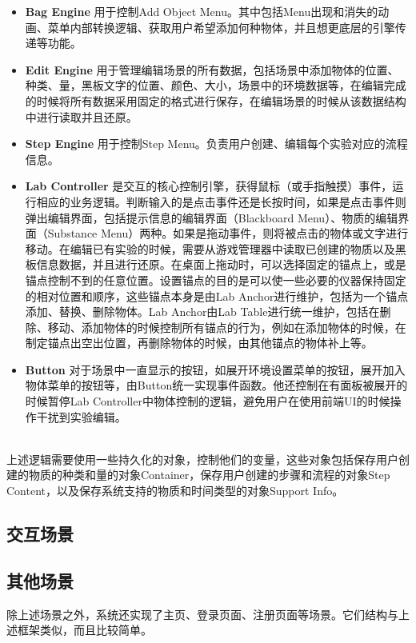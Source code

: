 \begin{itemize}
    \item \textbf{Bag Engine}
用于控制Add Object Menu。其中包括Menu出现和消失的动画、菜单内部转换逻辑、获取用户希望添加何种物体，并且想更底层的引擎传递等功能。
    
    \item \textbf{Edit Engine}
用于管理编辑场景的所有数据，包括场景中添加物体的位置、种类、量，黑板文字的位置、颜色、大小，场景中的环境数据等，在编辑完成的时候将所有数据采用固定的格式进行保存，在编辑场景的时候从该数据结构中进行读取并且还原。
    
    \item \textbf{Step Engine}
用于控制Step Menu。负责用户创建、编辑每个实验对应的流程信息。

    \item \textbf{Lab Controller}
是交互的核心控制引擎，获得鼠标（或手指触摸）事件，运行相应的业务逻辑。判断输入的是点击事件还是长按时间，如果是点击事件则弹出编辑界面，包括提示信息的编辑界面（Blackboard Menu）、物质的编辑界面（Substance Menu）两种。如果是拖动事件，则将被点击的物体或文字进行移动。在编辑已有实验的时候，需要从游戏管理器中读取已创建的物质以及黑板信息数据，并且进行还原。在桌面上拖动时，可以选择固定的锚点上，或是锚点控制不到的任意位置。设置锚点的目的是可以使一些必要的仪器保持固定的相对位置和顺序，这些锚点本身是由Lab Anchor进行维护，包括为一个锚点添加、替换、删除物体。Lab Anchor由Lab Table进行统一维护，包括在删除、移动、添加物体的时候控制所有锚点的行为，例如在添加物体的时候，在制定锚点出空出位置，再删除物体的时候，由其他锚点的物体补上等。

    \item \textbf{Button}
对于场景中一直显示的按钮，如展开环境设置菜单的按钮，展开加入物体菜单的按钮等，由Button统一实现事件函数。他还控制在有面板被展开的时候暂停Lab Controller中物体控制的逻辑，避免用户在使用前端UI的时候操作干扰到实验编辑。
\end{itemize}
~\\
\indent    	上述逻辑需要使用一些持久化的对象，控制他们的变量，这些对象包括保存用户创建的物质的种类和量的对象Container，保存用户创建的步骤和流程的对象Step Content，以及保存系统支持的物质和时间类型的对象Support Info。

\subsection{交互场景}
\subsection{其他场景}
除上述场景之外，系统还实现了主页、登录页面、注册页面等场景。它们结构与上述框架类似，而且比较简单。

